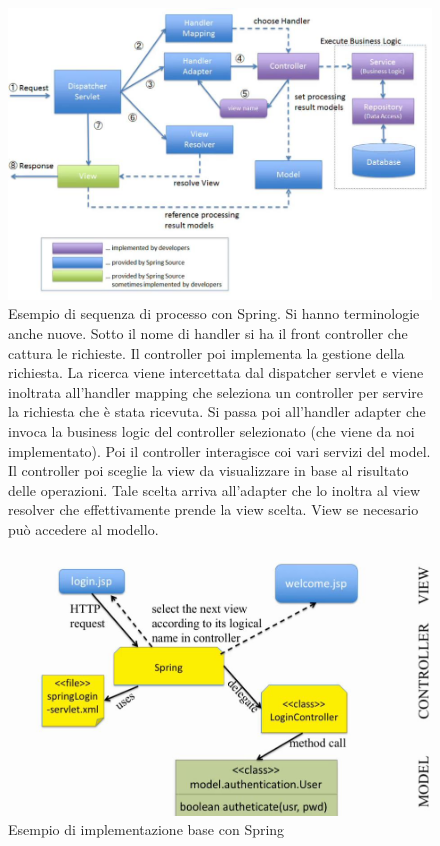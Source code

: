 \documentclass[a4paper,12pt, oneside]{book}
\begin{document}
\begin{figure}[H]
  \centering
  \includegraphics[scale = 0.4]{img/spring.jpg}
  \caption{Esempio di sequenza di processo con Spring. Si hanno terminologie
    anche nuove. Sotto il nome di handler si ha il front controller che cattura
    le richieste. Il controller poi implementa la gestione della richiesta. La
    ricerca viene intercettata dal dispatcher servlet e viene inoltrata
    all'handler mapping che seleziona un controller per servire la richiesta che
    è stata ricevuta. Si passa poi all'handler adapter che invoca la business
    logic del controller selezionato (che viene da noi implementato). Poi il
    controller interagisce coi vari servizi del model. Il controller poi sceglie
    la view da visualizzare in base al risultato delle operazioni. Tale scelta
    arriva all'adapter che lo inoltra al view resolver che effettivamente prende
    la view scelta. View se necesario può accedere al modello.} 
  \label{fig:fc}
\end{figure}
\begin{figure}[H]
  \centering
  \includegraphics[scale = 0.4]{img/spring2.jpg}
  \caption{Esempio di implementazione base con Spring} 
  \label{fig:fc}
\end{figure}
\end{document}
